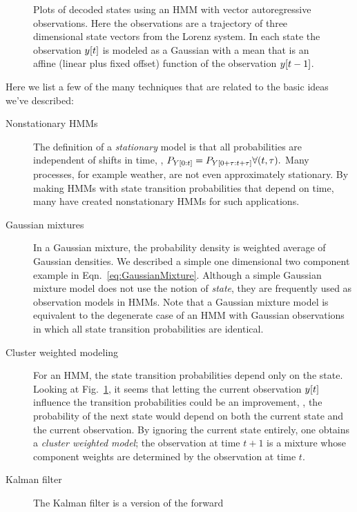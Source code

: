 \begin{figure}[p]
  \caption[Vector autoregressive observation
  models.]%
  {Plots of decoded states using an HMM with vector autoregressive
    observations.  Here the observations are a trajectory of three
    dimensional state vectors from the Lorenz system.  In each state
    the observation ${y}{[t]}$ is modeled as a Gaussian with a mean
    that is an affine (linear plus fixed offset) function of the
    observation ${y}{[t-1]}$.}
  \label{fig:VARGstates}
\end{figure}

Here we list a few of the many techniques that are related to the
basic ideas we've described:
\begin{description}
\item[Nonstationary HMMs] The definition of a \emph{stationary} model
  is that all probabilities are independent of shifts in time, \ie, $
  P_{Y[0:t]} = P_{Y[0+\tau:t+\tau]} \forall (t,\tau).$
  Many processes, for example weather, are not even approximately
  stationary.  By making HMMs with state transition probabilities that
  depend on time, many have created nonstationary HMMs for such
  applications.
\item[Gaussian mixtures] In a Gaussian mixture, the probability
  density is weighted average of Gaussian densities.  We described a
  simple one dimensional two component example in
  Eqn.~\eqref{eq:GaussianMixture}.  Although a simple Gaussian mixture
  model does not use the notion of \emph{state}, they are frequently
  used as observation models in HMMs.  Note that a Gaussian mixture
  model is equivalent to the degenerate case of an HMM with Gaussian
  observations in which all state transition probabilities are
  identical.
\item[Cluster weighted modeling] For an HMM, the state transition
  probabilities depend only on the state.  Looking at
  Fig.~\ref{fig:VARGstates}, it seems that letting the current
  observation ${y}{[t]}$ influence the transition probabilities could
  be an improvement, \ie, the probability of the next state would
  depend on both the current state and the current observation.  By
  ignoring the current state entirely, one obtains a \emph{ cluster
    weighted model}\cite{Gershenfeld99}; the observation at time $t+1$
  is a mixture whose component weights are determined by the
  observation at time $t$.
\item[Kalman filter] The Kalman filter is a version of the forward

\end{description}
